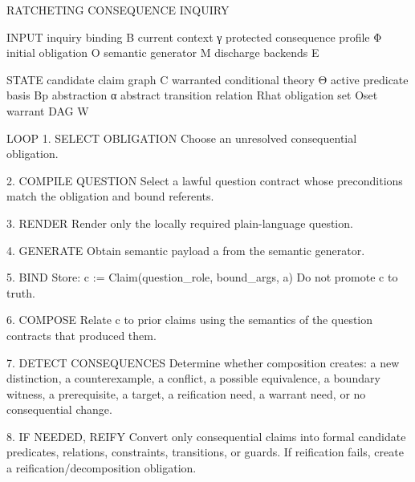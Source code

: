 \documentclass[
]{article}
\newenvironment{Shaded}{}{}
\newcommand{\NormalTok}[1]{#1}
\begin{document}
\begin{Shaded}
\begin{Highlighting}[]
\NormalTok{RATCHETING CONSEQUENCE INQUIRY}

\NormalTok{INPUT}
\NormalTok{    inquiry binding B}
\NormalTok{    current context γ}
\NormalTok{    protected consequence profile Φ}
\NormalTok{    initial obligation O}
\NormalTok{    semantic generator M}
\NormalTok{    discharge backends E}

\NormalTok{STATE}
\NormalTok{    candidate claim graph C}
\NormalTok{    warranted conditional theory Θ}
\NormalTok{    active predicate basis Bp}
\NormalTok{    abstraction α}
\NormalTok{    abstract transition relation Rhat}
\NormalTok{    obligation set Oset}
\NormalTok{    warrant DAG W}

\NormalTok{LOOP}
\NormalTok{1. SELECT OBLIGATION}
\NormalTok{   Choose an unresolved consequential obligation.}

\NormalTok{2. COMPILE QUESTION}
\NormalTok{   Select a lawful question contract whose preconditions match}
\NormalTok{   the obligation and bound referents.}

\NormalTok{3. RENDER}
\NormalTok{   Render only the locally required plain{-}language question.}

\NormalTok{4. GENERATE}
\NormalTok{   Obtain semantic payload a from the semantic generator.}

\NormalTok{5. BIND}
\NormalTok{   Store:}
\NormalTok{       c := Claim(question\_role, bound\_args, a)}
\NormalTok{   Do not promote c to truth.}

\NormalTok{6. COMPOSE}
\NormalTok{   Relate c to prior claims using the semantics of the question}
\NormalTok{   contracts that produced them.}

\NormalTok{7. DETECT CONSEQUENCES}
\NormalTok{   Determine whether composition creates:}
\NormalTok{       a new distinction,}
\NormalTok{       a counterexample,}
\NormalTok{       a conflict,}
\NormalTok{       a possible equivalence,}
\NormalTok{       a boundary witness,}
\NormalTok{       a prerequisite,}
\NormalTok{       a target,}
\NormalTok{       a reification need,}
\NormalTok{       a warrant need,}
\NormalTok{       or no consequential change.}

\NormalTok{8. IF NEEDED, REIFY}
\NormalTok{   Convert only consequential claims into formal candidate predicates,}
\NormalTok{   relations, constraints, transitions, or guards.}
\NormalTok{   If reification fails, create a reification/decomposition obligation.}


\end{Highlighting}
\end{Shaded}
\end{document}

